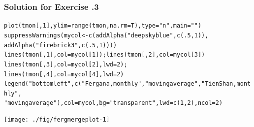 \documentclass[xcolor=table, xcolor=dvipsnames]{beamer}\usepackage[]{graphicx}\usepackage[]{color}
\makeatletter
\newcommand{\hlnum}[1]{\textcolor[rgb]{0,0,0}{#1}}
\newcommand{\hlstr}[1]{\textcolor[rgb]{0.545,0.137,0.137}{#1}}
\newcommand{\hlstd}[1]{\textcolor[rgb]{0,0,0}{#1}}
\newcommand{\hlkwb}[1]{\textcolor[rgb]{0,0,0}{#1}}
\newcommand{\hlkwc}[1]{\textcolor[rgb]{1,0,1}{#1}}
\newcommand{\hlkwd}[1]{\textcolor[rgb]{0,0,1}{#1}}
\newenvironment{kframe}{%
 \def\at@end@of@kframe{}%
 \ifinner\ifhmode%
  \def\at@end@of@kframe{\end{minipage}}%
  \begin{minipage}{\columnwidth}%
 \fi\fi%
 \def\FrameCommand##1{\hskip\@totalleftmargin \hskip-\fboxsep
 \colorbox{shadecolor}{##1}\hskip-\fboxsep
     \hskip-\linewidth \hskip-\@totalleftmargin \hskip\columnwidth}%
 \MakeFramed {\advance\hsize-\width
   \@totalleftmargin\z@ \linewidth\hsize
   \@setminipage}}%
 {\par\unskip\endMakeFramed%
 \at@end@of@kframe}
\newenvironment{knitrout}{}{} %
\newcounter{exercisecount}
\makeatother
\begin{document}
\begin{frame}[fragile]\frametitle{Solution for Exercise .3}

\begin{knitrout}\scriptsize
{}\color{fgcolor}\begin{kframe}
\begin{alltt}
\hlkwd{plot}\hlstd{(tmon[,}\hlnum{1}\hlstd{],} \hlkwc{ylim}\hlstd{=}\hlkwd{range}\hlstd{(tmon,} \hlkwc{na.rm}\hlstd{=T),} \hlkwc{type}\hlstd{=}\hlstr{"n"}\hlstd{,} \hlkwc{main}\hlstd{=}\hlstr{""}\hlstd{)}
\hlkwd{suppressWarnings}\hlstd{(mycol} \hlkwb{<-} \hlkwd{c}\hlstd{(}\hlkwd{addAlpha}\hlstd{(}\hlstr{"deepskyblue"}\hlstd{,} \hlkwd{c}\hlstd{(}\hlnum{.5}\hlstd{,}\hlnum{1}\hlstd{)),}
                            \hlkwd{addAlpha}\hlstd{(}\hlstr{"firebrick3"}\hlstd{,}  \hlkwd{c}\hlstd{(}\hlnum{.5}\hlstd{,}\hlnum{1}\hlstd{))))}
\hlkwd{lines}\hlstd{(tmon[,}\hlnum{1}\hlstd{],} \hlkwc{col}\hlstd{=mycol[}\hlnum{1}\hlstd{]);} \hlkwd{lines}\hlstd{(tmon[,}\hlnum{2}\hlstd{],} \hlkwc{col}\hlstd{=mycol[}\hlnum{3}\hlstd{])}
\hlkwd{lines}\hlstd{(tmon[,}\hlnum{3}\hlstd{],} \hlkwc{col}\hlstd{=mycol[}\hlnum{2}\hlstd{],} \hlkwc{lwd}\hlstd{=}\hlnum{2}\hlstd{);}
\hlkwd{lines}\hlstd{(tmon[,}\hlnum{4}\hlstd{],} \hlkwc{col}\hlstd{=mycol[}\hlnum{4}\hlstd{],} \hlkwc{lwd}\hlstd{=}\hlnum{2}\hlstd{)}
\hlkwd{legend}\hlstd{(}\hlstr{"bottomleft"}\hlstd{,} \hlkwd{c}\hlstd{(}\hlstr{"Fergana, monthly"}\hlstd{,}\hlstr{"moving average"}\hlstd{,}\hlstr{"Tien Shan, monthly"}\hlstd{,}
\hlstr{"moving average"}\hlstd{),} \hlkwc{col}\hlstd{=mycol,} \hlkwc{bg}\hlstd{=}\hlstr{"transparent"}\hlstd{,} \hlkwc{lwd}\hlstd{=}\hlkwd{c}\hlstd{(}\hlnum{1}\hlstd{,}\hlnum{2}\hlstd{),} \hlkwc{ncol}\hlstd{=}\hlnum{2}\hlstd{)}
\end{alltt}
\end{kframe}

{\centering \texttt{[image: ./fig/fergmergeplot-1]} 

}



\end{knitrout}
\end{frame}

\end{document}
